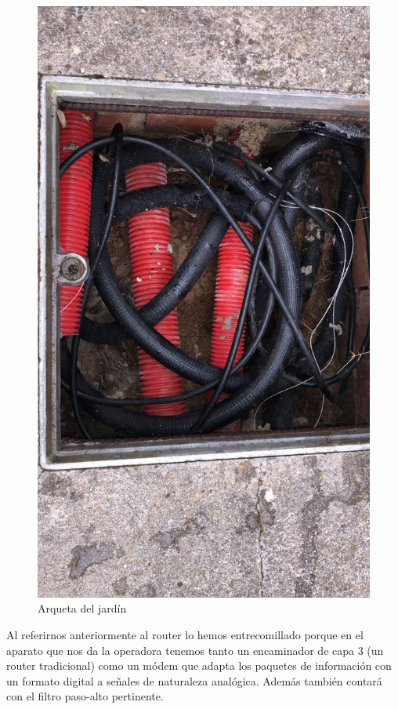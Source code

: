 \documentclass{article}[12 pt]
\begin{document}
			\begin{figure}
				\centering
				\includegraphics[scale=0.3, angle=90]{arqueta.jpg}
				\caption{Arqueta del jardín}
				\label{f:arqueta}
			\end{figure}

			Al referirnos anteriormente al router lo hemos entrecomillado porque en el aparato que nos da la operadora tenemos tanto un encaminador de capa 3 (un router tradicional) como un módem que adapta los paquetes de información con un formato digital a señales de naturaleza analógica. Además también contará con el filtro paso-alto pertinente.\\
\end{document}
